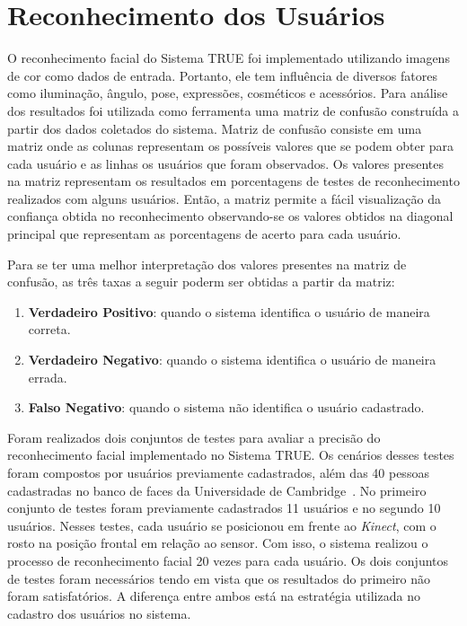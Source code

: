 \section{Reconhecimento dos Usuários}
	 
	O reconhecimento facial do Sistema TRUE foi implementado utilizando imagens de cor como dados de entrada. Portanto, ele tem influência de diversos fatores como iluminação, ângulo, pose, expressões, cosméticos e acessórios. Para análise dos resultados foi utilizada como ferramenta uma matriz de confusão construída a partir dos dados coletados do sistema. Matriz de confusão consiste em uma matriz onde as colunas representam os possíveis valores que se podem obter para cada usuário e as linhas os usuários que foram observados. Os valores presentes na matriz representam os resultados em porcentagens de testes de reconhecimento realizados com alguns usuários. Então, a matriz permite a fácil visualização da confiança obtida no reconhecimento observando-se os valores obtidos na diagonal principal que representam as porcentagens de acerto para cada usuário.

	Para se ter uma melhor interpretação dos valores presentes na matriz de confusão, as três taxas a seguir poderm ser obtidas a partir da matriz:

	\begin{enumerate}
		\item \textbf{Verdadeiro Positivo}: quando o sistema identifica o usuário de maneira correta.
		\item \textbf{Verdadeiro Negativo}: quando o sistema identifica o usuário de maneira errada.
		\item \textbf{Falso Negativo}: quando o sistema não identifica o usuário cadastrado.
	\end{enumerate}

	Foram realizados dois conjuntos de testes para avaliar a precisão do reconhecimento facial implementado no Sistema TRUE. Os cenários desses testes foram compostos por usuários previamente cadastrados, além das 40 pessoas cadastradas no banco de faces da Universidade de Cambridge~\cite{cambridgeFaceDb}. No primeiro conjunto de testes foram previamente cadastrados 11 usuários e no segundo 10 usuários. Nesses testes, cada usuário se posicionou em frente ao \textit{Kinect}, com o rosto na posição frontal em relação ao sensor. Com isso, o sistema realizou o processo de reconhecimento facial 20 vezes para cada usuário. Os dois conjuntos de testes foram necessários tendo em vista que os resultados do primeiro não foram satisfatórios. A diferença entre ambos está na estratégia utilizada no cadastro dos usuários no sistema. 

